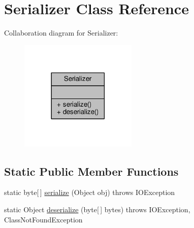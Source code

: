 \hypertarget{a00015}{\section{Serializer Class Reference}
\label{a00015}
}


Collaboration diagram for Serializer\+:
\nopagebreak
\begin{figure}[H]
\begin{center}
\leavevmode
\includegraphics[width=158pt]{a00051}
\end{center}
\end{figure}
\subsection*{Static Public Member Functions}
\begin{DoxyCompactItemize}
\item 
static byte\mbox{[}$\,$\mbox{]} \hyperlink{a00015_a1331717cb2a54bf8a95a0555403da236}{serialize} (Object obj)  throws I\+O\+Exception 
\item 
static Object \hyperlink{a00015_a79bdcf2199693e6c879cdd89c30926b9}{deserialize} (byte\mbox{[}$\,$\mbox{]} bytes)  throws I\+O\+Exception, Class\+Not\+Found\+Exception 
\end{DoxyCompactItemize}



